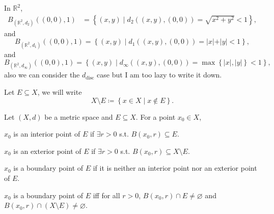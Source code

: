 \begin{eg}
    In \(\mathbb{R} ^2\), 
    \begin{align*}
        B_{(\mathbb{R} ^2, d_2)} \left( (0, 0), 1 \right) &= \left\{ (x, y) \mid d_2 ((x, y), (0, 0)) = \sqrt{x^2 + y^2}  < 1 \right\},
    \end{align*}
    and 
    \[
        B_{(\mathbb{R} ^2, d_1)}((0,0), 1) = \left\{ (x, y) \mid d_1((x, y), (0, 0)) = \vert x \vert + \vert y \vert < 1   \right\}, 
    \] and 
    \[
        B_{(\mathbb{R} ^2, d_\infty)} ((0,0), 1) = \left\{ (x, y) \mid d_\infty ((x, y), (0, 0)) = \max \left\{ \vert x \vert, \vert y \vert \right\} < 1  \right\},
    \]
    also we can consider the \(d_{\text{disc}}\) case but I am too lazy to write it down. 
\end{eg}

\begin{notation}
    Let \(E \subseteq X\), we will write 
    \[
        X \setminus E \coloneqq  \left\{ x \in X \mid x \notin E\right\}. 
    \] 
\end{notation}

\begin{definition*}
    Let \((X, d)\) be a metric space and \(E \subseteq X\). For a point \(x_0 \in X\),
    \begin{definition} \label{def: interior point}
        \(x_0\) is an interior point of \(E\) if \(\exists r > 0\) s.t. \(B(x_0, r) \subseteq E\).     
    \end{definition}
    \begin{definition} \label{def: exterior point}
        \(x_0\) is an exterior point of \(E\) if \(\exists r > 0\) s.t. \(B(x_0, r) \subseteq X \setminus E\).    
    \end{definition}
    \begin{definition} \label{def: boundary point}
        \(x_0\) is a boundary point of \(E\) if it is neither an interior point nor an exterior point of \(E\).   
    \end{definition}
\end{definition*}

\begin{proposition} \label{prop: boundary equivalent}
    \(x_0\) is a boundary point of \(E\) iff for all \(r>0\), \(B(x_0, r) \cap E \neq \varnothing \) and \(B(x_0, r) \cap \left( X \setminus E \right) \neq \varnothing\).     
\end{proposition}
